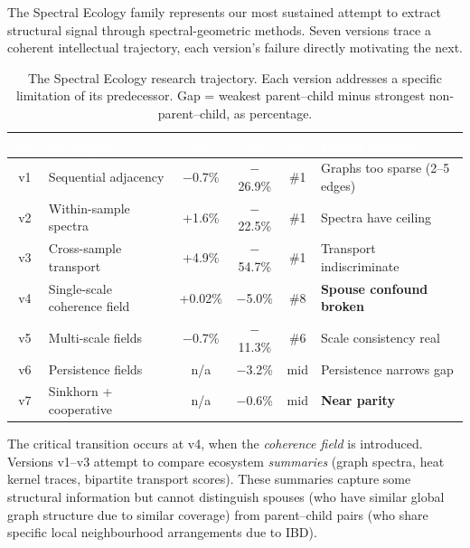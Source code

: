\documentclass{../yalumba}
\begin{document}
The Spectral Ecology family represents our most sustained attempt to
extract structural signal through spectral-geometric methods.  Seven
versions trace a coherent intellectual trajectory, each version's failure
directly motivating the next.

\begin{table}[H]
  \centering
  \tablestyle
  \caption{The Spectral Ecology research trajectory.  Each version
    addresses a specific limitation of its predecessor.  Gap = weakest
    parent--child minus strongest non-parent--child, as percentage.}
  \label{tab:spectral_arc}
  \begin{tabular}{clcccl}
    \toprule
    \rowcolor{table-header}
    \textcolor{white}{\textbf{Ver}} &
    \textcolor{white}{\textbf{Paradigm}} &
    \textcolor{white}{\textbf{Sep}} &
    \textcolor{white}{\textbf{Gap}} &
    \textcolor{white}{\textbf{Sp.}} &
    \textcolor{white}{\textbf{Lesson learned}} \\
    \midrule
    v1 & Sequential adjacency
      & $-$0.7\% & $-$26.9\% & \#1
      & Graphs too sparse (2--5 edges) \\
    v2 & Within-sample spectra
      & +1.6\% & $-$22.5\% & \#1
      & Spectra have ceiling \\
    v3 & Cross-sample transport
      & +4.9\% & $-$54.7\% & \#1
      & Transport indiscriminate \\
    v4 & Single-scale coherence field
      & +0.02\% & $-$5.0\% & \#8
      & \textbf{Spouse confound broken} \\
    v5 & Multi-scale fields
      & $-$0.7\% & $-$11.3\% & \#6
      & Scale consistency real \\
    v6 & Persistence fields
      & n/a & $-$3.2\% & mid
      & Persistence narrows gap \\
    v7 & Sinkhorn + cooperative
      & n/a & $-$0.6\% & mid
      & \textbf{Near parity} \\
    \bottomrule
  \end{tabular}
\end{table}


The critical transition occurs at v4, when the \emph{coherence field}
is introduced.  Versions v1--v3 attempt to compare ecosystem
\emph{summaries} (graph spectra, heat kernel traces, bipartite
transport scores).  These summaries capture some structural information
but cannot distinguish spouses (who have similar global graph structure
due to similar coverage) from parent--child pairs (who share specific
local neighbourhood arrangements due to IBD).
\end{document}
